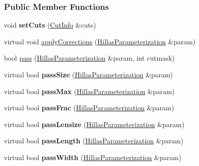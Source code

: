 \subsubsection*{Public Member Functions}
\begin{DoxyCompactItemize}
\item 
\hypertarget{classSuperCutter_afef1e5673173418db910fd8b74a0c117}{
void {\bfseries setCuts} (\hyperlink{structCutInfo}{CutInfo} \&cuts)}
\label{classSuperCutter_afef1e5673173418db910fd8b74a0c117}

\item 
virtual void \hyperlink{classSuperCutter_aa9affeb3c4e8b66860f26bd96954b4e1}{applyCorrections} (\hyperlink{structHillasParameterization}{HillasParameterization} \&param)
\item 
bool \hyperlink{classSuperCutter_a10e29b1d569a2b09755e44c31b3c1e61}{pass} (\hyperlink{structHillasParameterization}{HillasParameterization} \&param, int cutmask)
\item 
\hypertarget{classSuperCutter_a2946c8f20d16e08c4f9a8c63b7c237b6}{
virtual bool {\bfseries passSize} (\hyperlink{structHillasParameterization}{HillasParameterization} \&param)}
\label{classSuperCutter_a2946c8f20d16e08c4f9a8c63b7c237b6}

\item 
\hypertarget{classSuperCutter_a0ec9ec3f8df7638aec89c59bf4af458f}{
virtual bool {\bfseries passMax} (\hyperlink{structHillasParameterization}{HillasParameterization} \&param)}
\label{classSuperCutter_a0ec9ec3f8df7638aec89c59bf4af458f}

\item 
\hypertarget{classSuperCutter_ae140b08bee33e70c4df40ff1f48d907e}{
virtual bool {\bfseries passFrac} (\hyperlink{structHillasParameterization}{HillasParameterization} \&param)}
\label{classSuperCutter_ae140b08bee33e70c4df40ff1f48d907e}

\item 
\hypertarget{classSuperCutter_ade36950d2010a1b1aa78920daa7b4eba}{
virtual bool {\bfseries passLensize} (\hyperlink{structHillasParameterization}{HillasParameterization} \&param)}
\label{classSuperCutter_ade36950d2010a1b1aa78920daa7b4eba}

\item 
\hypertarget{classSuperCutter_aa039b048229ae254c2466b6fd0e0a1af}{
virtual bool {\bfseries passLength} (\hyperlink{structHillasParameterization}{HillasParameterization} \&param)}
\label{classSuperCutter_aa039b048229ae254c2466b6fd0e0a1af}

\item 
\hypertarget{classSuperCutter_a2e9282736f529a09555f968edf1f6e60}{
virtual bool {\bfseries passWidth} (\hyperlink{structHillasParameterization}{HillasParameterization} \&param)}
\label{classSuperCutter_a2e9282736f529a09555f968edf1f6e60}


\end{DoxyCompactItemize}

